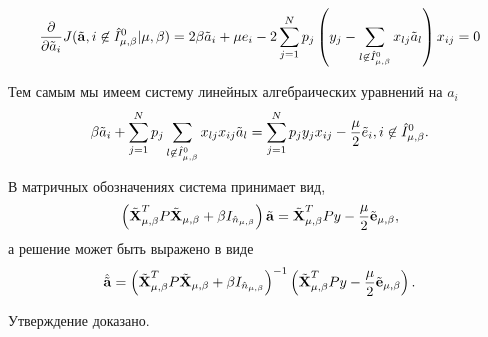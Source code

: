 \begin{Proof}
\begin{equation}
	\frac{\partial}{\partial\tilde a_i}J(\tilde{\boldsymbol{\mathbf{a}}}, i\not\in \hat I^0_{\mu,\beta} | {\mu,\beta})
		= 2\beta \tilde a_i + \mu e_i - 2\sum\limits_{j=1}^N p_j\left(y_j - \sum\limits_{l\not\in \hat I^0_{\mu,\beta}}x_{lj}\tilde a_l\right)x_{ij} = 0
\end{equation}

Тем самым мы имеем систему линейных алгебраических уравнений на $a_i$
\begin{equation*}
	\beta \tilde a_i + \sum\limits_{j=1}^N p_j\sum\limits_{l\not\in \hat I^0_{\mu,\beta}} x_{lj}x_{ij}\tilde a_l
		= \sum\limits_{j=1}^N p_jy_jx_{ij} -\frac\mu2 \tilde e_i, i\not\in \hat I^0_{\mu,\beta}.
\end{equation*}

В матричных обозначениях система принимает вид,
\begin{equation*}
	\left(\tilde{\boldsymbol{\mathbf{X}}}^T_{\mu,\beta} P\tilde{\boldsymbol{\mathbf{X}}}_{\mu,\beta} + \beta I_{\hat n_{\mu,\beta}}\right) \tilde{\boldsymbol{\mathbf{a}}}
		= \tilde{\boldsymbol{\mathbf{X}}}^T_{\mu,\beta} P y -\frac\mu2\tilde{\boldsymbol{\mathbf{e}}}_{\mu,\beta},
\end{equation*}
а решение может быть выражено в виде
\begin{equation}
	\hat{\tilde{\mathbf a}}
		= \left(\tilde{\boldsymbol{\mathbf{X}}}^T_{\mu,\beta} P\tilde{\boldsymbol{\mathbf{X}}}_{\mu,\beta} + \beta I_{\hat n_{\mu,\beta}}\right)^{-1}\left(\tilde{\boldsymbol{\mathbf{X}}}^T_{\mu,\beta} P y -\frac\mu2\tilde{\boldsymbol{\mathbf{e}}}_{\mu,\beta}\right).
\end{equation}

Утверждение доказано.
\end{Proof}

